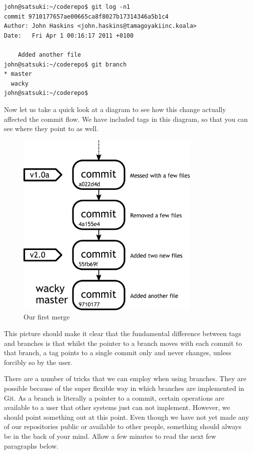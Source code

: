 \begin{Verbatim}
john@satsuki:~/coderepo$ git log -n1
commit 9710177657ae00665ca8f8027b17314346a5b1c4
Author: John Haskins <john.haskins@tamagoyakiinc.koala>
Date:   Fri Apr 1 00:16:17 2011 +0100

    Added another file
john@satsuki:~/coderepo$ git branch
* master
  wacky
john@satsuki:~/coderepo$ 
\end{Verbatim}

Now let us take a quick look at a diagram to see how this change actually affected the commit flow.  We have included tags in this diagram, so that you can see where they point to as well.

\begin{figure}[hbt]
\centering
\includegraphics[width=9cm]{images/f-w4-d2.pdf}
\caption{Our first merge}
\end{figure}

This picture should make it clear that the fundamental difference between tags and branches is that whilst the pointer to a branch moves with each commit to that branch, a tag points to a single commit only and never changes, unless forcibly so by the user.

There are a number of tricks that we can employ when using branches.  They are possible because of the super flexible way in which branches are implemented in Git.  As a branch is literally a pointer to a commit, certain operations are available to a user that other systems just can not implement.  However, we should point something out at this point.  Even though we have not yet made any of our repositories public or available to other people, something should always be in the back of your mind.  Allow a few minutes to read the next few paragraphs below.

